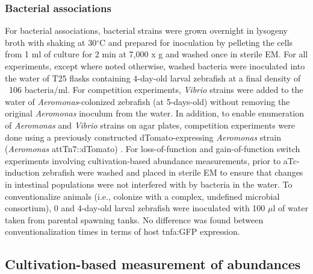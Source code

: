 {{{{{{{\subsubsection{Bacterial associations} 
For bacterial associations, bacterial strains were grown overnight in lysogeny broth with shaking at 30$^\circ$C and prepared for inoculation by pelleting the cells from 1 ml of culture for 2 min at 7,000 x g and washed once in sterile EM. For all experiments, except where noted otherwise, washed bacteria were inoculated into the water of T25 flasks containing 4-day-old larval zebrafish at a final density of ~106 bacteria/ml. For competition experiments, \textit{Vibrio} strains were added to the water of \textit{Aeromonas}-colonized zebrafish (at 5-days-old) without removing the original \textit{Aeromonas} inoculum from the water. In addition, to enable enumeration of \textit{Aeromonas} and \textit{Vibrio} strains on agar plates, competition experiments were done using a previously constructed dTomato-expressing \textit{Aeromonas} strain (\textit{Aeromonas} attTn7::dTomato) \cite{wiles_modernized_2018}. For loss-of-function and gain-of-function switch experiments involving cultivation-based abundance measurements, prior to aTc-induction zebrafish were washed and placed in sterile EM to ensure that changes in intestinal populations were not interfered with by bacteria in the water. To conventionalize animals (i.e., colonize with a complex, undefined microbial consortium), 0 and 4-day-old larval zebrafish were inoculated with 100 $\mu$l of water taken from parental spawning tanks. No difference was found between conventionalization times in terms of host tnfa:GFP expression. 

\subsection{Cultivation-based measurement of abundances}

}}}}}}}
